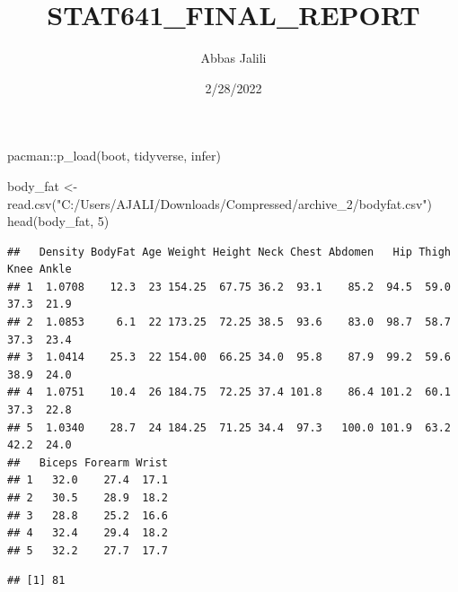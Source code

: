 \documentclass[
]{article}
\title{STAT641\_FINAL\_REPORT}
\author{Abbas Jalili}
\date{2/28/2022}
\newenvironment{Shaded}{\begin{snugshade}}{\end{snugshade}}
\newcommand{\DecValTok}[1]{\textcolor[rgb]{0.00,0.00,0.81}{#1}}
\newcommand{\FunctionTok}[1]{\textcolor[rgb]{0.00,0.00,0.00}{#1}}
\newcommand{\NormalTok}[1]{#1}
\newcommand{\OtherTok}[1]{\textcolor[rgb]{0.56,0.35,0.01}{#1}}
\newcommand{\SpecialCharTok}[1]{\textcolor[rgb]{0.00,0.00,0.00}{#1}}
\newcommand{\StringTok}[1]{\textcolor[rgb]{0.31,0.60,0.02}{#1}}
\begin{document}
\maketitle

\begin{Shaded}
\begin{Highlighting}[]
\NormalTok{pacman}\SpecialCharTok{::}\FunctionTok{p\_load}\NormalTok{(boot, tidyverse, infer)}
\end{Highlighting}
\end{Shaded}

\begin{Shaded}
\begin{Highlighting}[]
\NormalTok{body\_fat }\OtherTok{\textless{}{-}} \FunctionTok{read.csv}\NormalTok{(}\StringTok{"C:/Users/AJALI/Downloads/Compressed/archive\_2/bodyfat.csv"}\NormalTok{)}
\FunctionTok{head}\NormalTok{(body\_fat, }\DecValTok{5}\NormalTok{)}
\end{Highlighting}
\end{Shaded}

\begin{verbatim}
##   Density BodyFat Age Weight Height Neck Chest Abdomen   Hip Thigh Knee Ankle
## 1  1.0708    12.3  23 154.25  67.75 36.2  93.1    85.2  94.5  59.0 37.3  21.9
## 2  1.0853     6.1  22 173.25  72.25 38.5  93.6    83.0  98.7  58.7 37.3  23.4
## 3  1.0414    25.3  22 154.00  66.25 34.0  95.8    87.9  99.2  59.6 38.9  24.0
## 4  1.0751    10.4  26 184.75  72.25 37.4 101.8    86.4 101.2  60.1 37.3  22.8
## 5  1.0340    28.7  24 184.25  71.25 34.4  97.3   100.0 101.9  63.2 42.2  24.0
##   Biceps Forearm Wrist
## 1   32.0    27.4  17.1
## 2   30.5    28.9  18.2
## 3   28.8    25.2  16.6
## 4   32.4    29.4  18.2
## 5   32.2    27.7  17.7
\end{verbatim}

\begin{Shaded}
\end{Shaded}

\begin{verbatim}
## [1] 81
\end{verbatim}

\begin{Shaded}
\end{Shaded}
\end{document}
